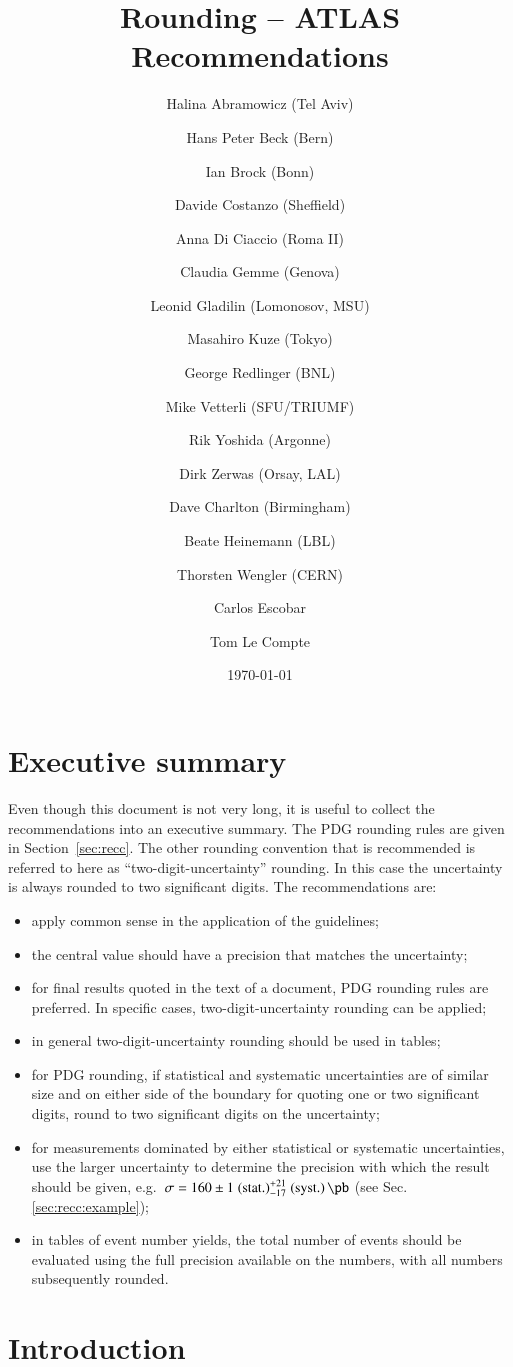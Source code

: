 \documentclass[UKenglish]{style/atlasdoc}
\title{Rounding -- ATLAS Recommendations}
\author[a]{Halina Abramowicz (Tel Aviv)}
\author[a]{Hans Peter Beck (Bern)}
\author[a]{Ian Brock (Bonn)}
\author[a]{Davide Costanzo (Sheffield)}
\author[a]{Anna Di Ciaccio (Roma II)}
\author[a]{Claudia Gemme (Genova)}
\author[a]{Leonid Gladilin (Lomonosov, MSU)}
\author[a]{Masahiro Kuze (Tokyo)}
\author[a]{George Redlinger (BNL)}
\author[a]{Mike Vetterli (SFU/TRIUMF)}
\author[a]{Rik Yoshida (Argonne)}
\author[a]{Dirk Zerwas (Orsay, LAL)}
\author[a]{Dave Charlton (Birmingham)}
\author[a]{Beate Heinemann (LBL)}
\author[a]{Thorsten Wengler (CERN)}
\author[b]{Carlos Escobar}
\author[c]{Tom Le Compte}
\affil[a]{ATLAS Publications Committee}
\affil[b]{University of Pittsburgh}
\affil[c]{Argonne National Lab.}
\date{\today}
\begin{document}
\section{Executive summary}
\label{sec:summary}

Even though this document is not very long, it is
useful to collect the recommendations into an executive summary.
The PDG rounding rules are given in Section~\ref{sec:recc}. The other
rounding convention that is recommended is referred to here as \enquote{two-digit-uncertainty}
rounding. In this case the uncertainty is always rounded to two
significant digits. The recommendations are:
\begin{itemize}
\item apply common sense in the application of the guidelines;
\item the central value should have a precision that
  matches the uncertainty;
\item for final results quoted in the text of a document, PDG rounding
  rules are preferred. In specific cases, two-digit-uncertainty
  rounding can be applied;
\item in general two-digit-uncertainty rounding should be used in
  tables;
\item for PDG rounding, if statistical and systematic uncertainties are of
similar size and on either side of the boundary for quoting one or two
significant digits, round to two significant digits on the uncertainty;
\item for measurements dominated by either statistical or systematic
  uncertainties, use the larger uncertainty to determine the precision
  with which the result should be given, e.g.\ $\sigma = 160 \pm
  1\stat ^{+21}_{-17}\syst\,\si{\pb}$ (see Sec.\ref{sec:recc:example});
\item in tables of event number yields, the total number of events
  should be evaluated using the full precision available on the numbers,
with all numbers subsequently rounded.
 \end{itemize}


\section{Introduction}
\label{sec:intro}
\end{document}

